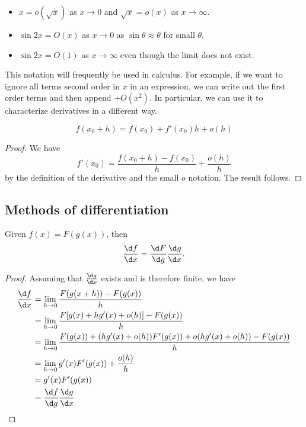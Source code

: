 \documentclass[a4paper]{article}
\begin{document}
\begin{eg}\leavevmode
  \begin{itemize}
    \item $x=o(\sqrt{x})$ as $x\to 0$ and $\sqrt{x} = o(x)$ as $x\to \infty$.
    \item $\sin 2x = O(x)$ as $x\to 0$ as $\sin \theta \approx \theta$ for small $\theta$.
    \item $\sin 2x = O(1)$ as $x\to \infty$ even though the limit does not exist.
  \end{itemize}
\end{eg}

This notation will frequently be used in calculus. For example, if we want to ignore all terms second order in $x$ in an expression, we can write out the first order terms and then append $+O(x^2)$. In particular, we can use it to characterize derivatives in a different way.
\begin{prop}
  \[
    f(x_0 + h) = f(x_0) + f'(x_0)h + o(h)
  \]
\end{prop}

\begin{proof}
  We have
  \[
    f'(x_0) = \frac{f(x_0 + h) - f(x_0)}{h} + \frac{o(h)}{h}
  \]
  by the definition of the derivative and the small $o$ notation. The result follows.
\end{proof}

\subsection{Methods of differentiation}
\begin{thm}
  Given $f(x) = F(g(x))$, then
  \[
    \frac{\d f}{\d x} = \frac{\d F}{\d g}\frac{\d g}{\d x}.
  \]
\end{thm}

\begin{proof}
  Assuming that $\frac{\d g}{\d x}$ exists and is therefore finite, we have
  \begin{align*}
    \frac{\d f}{\d x} &= \lim_{h\to 0}\frac{F(g(x + h)) - F(g(x))}{h}\\
    &= \lim_{h\to 0}\frac{F[g(x) + hg'(x) + o(h)] - F(g(x))}{h}\\
    &= \lim_{h\to 0}\frac{F(g(x)) + (hg'(x) + o(h))F'(g(x)) + o(hg'(x) + o(h)) - F(g(x))}{h}\\
    &= \lim_{h\to 0}g'(x)F'(g(x)) + \frac{o(h)}{h}\\
    &= g'(x)F'(g(x))\\
    &= \frac{\d f}{\d g}\frac{\d g}{\d x}
  \end{align*}
\end{proof}
\end{document}
